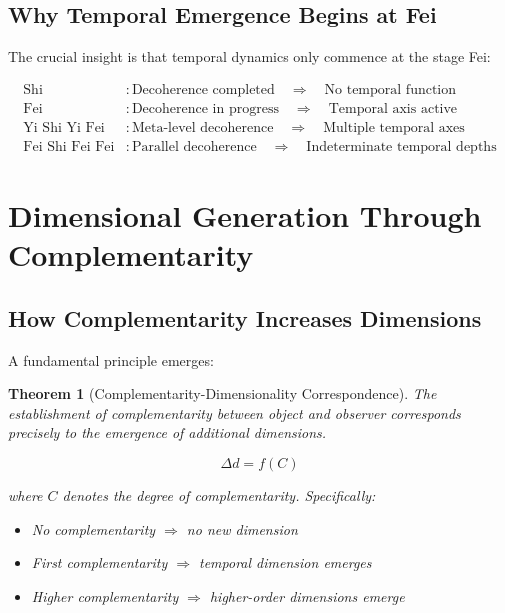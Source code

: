 \documentclass[12pt,a4paper]{article}
\newtheorem{theorem}[definition]{Theorem}
\begin{document}
\subsection{Why Temporal Emergence Begins at Fei}

The crucial insight is that temporal dynamics only commence at the stage Fei:

\begin{equation}
\begin{aligned}
\text{Shi} &: \text{Decoherence completed} \quad \Rightarrow \quad \text{No temporal function} \\
\text{Fei} &: \text{Decoherence in progress} \quad \Rightarrow \quad \text{Temporal axis active} \\
\text{Yi Shi Yi Fei} &: \text{Meta-level decoherence} \quad \Rightarrow \quad \text{Multiple temporal axes} \\
\text{Fei Shi Fei Fei} &: \text{Parallel decoherence} \quad \Rightarrow \quad \text{Indeterminate temporal depths}
\end{aligned}
\end{equation}

\section{Dimensional Generation Through Complementarity}

\subsection{How Complementarity Increases Dimensions}

A fundamental principle emerges:

\begin{theorem}[Complementarity-Dimensionality Correspondence]
The establishment of complementarity between object and observer corresponds precisely to the emergence of additional dimensions.

\begin{equation}
\Delta d = f(C)
\end{equation}

where $C$ denotes the degree of complementarity. Specifically:
\begin{itemize}
    \item No complementarity $\Rightarrow$ no new dimension
    \item First complementarity $\Rightarrow$ temporal dimension emerges
    \item Higher complementarity $\Rightarrow$ higher-order dimensions emerge
\end{itemize}
\end{theorem}
\end{document}
